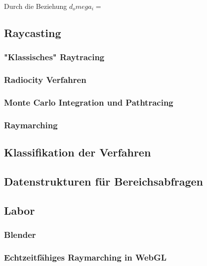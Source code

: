 Durch die Beziehung $d_omega_i = $

\subsection{Raycasting}
\subsubsection{"Klassisches" Raytracing}
\subsubsection{Radiocity Verfahren}
\subsubsection{Monte Carlo Integration und Pathtracing}
\subsubsection{Raymarching}
\subsection{Klassifikation der Verfahren}

\subsection{Datenstrukturen für Bereichsabfragen}


\subsection{Labor}
\subsubsection{Blender}
\subsubsection{Echtzeitfähiges Raymarching in WebGL}
